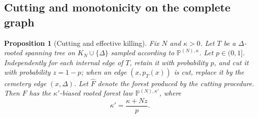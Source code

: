 \documentclass[11pt]{article}
\newtheorem{proposition}{Proposition}[section]
\begin{document}
\subsection{Cutting and monotonicity on the complete graph}

\begin{proposition}[Cutting and effective killing]
\label{prop:cutting-effective-killing}
Fix \(N\) and \(\kappa>0\). Let \(T\) be a
\(\Delta\)-rooted spanning tree on \(K_N\cup\{\Delta\}\) sampled according to
\(\mathbb P^{(N),\kappa}\). Let \(p\in(0,1]\). Independently
for each internal edge of \(T\), retain it with probability \(p\), and cut it
with probability \(z=1-p\); when an edge \((x,p_T(x))\) is cut, replace it by the
cemetery edge \((x,\Delta)\). Let \(\widehat F\) denote the forest produced by the cutting procedure.
Then \(\widehat F\) has the \(\kappa'\)-biased rooted forest law $\mathbb P^{(N),\kappa'}$, where
\[
\kappa'=\frac{\kappa+Nz}{p}.
\]


\end{proposition}
\end{document}
